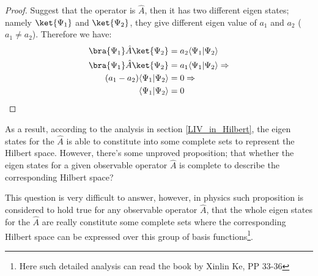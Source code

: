 \begin{proof}
  Suggest that the operator is $\hat{A}$, then it has two different
  eigen states; namely $\ket{\Psi_{1}}$ and $\ket{\Psi_{2}}$, they
  give different eigen value of $a_{1}$ and $a_{2}$ ($a_{1} \neq
  a_{2}$).  Therefore we have:
\begin{align}\label{}
\bra{\Psi_{1}}\hat{A}\ket{\Psi_{2}} &=
a_{2}\langle\Psi_{1}|\Psi_{2}\rangle \nonumber \\
\bra{\Psi_{1}}\hat{A}\ket{\Psi_{2}} &=
a_{1}\langle\Psi_{1}|\Psi_{2}\rangle \Rightarrow \nonumber \\
(a_{1}-a_{2})\langle\Psi_{1}|\Psi_{2}\rangle &= 0 \Rightarrow \nonumber \\
\langle\Psi_{1}|\Psi_{2}\rangle &= 0
\end{align}
\qedhere
\end{proof}
As a result, according to the analysis in section
\ref{LIV_in_Hilbert}, the eigen states for the $\hat{A}$ is able to
constitute into some complete sets to represent the Hilbert space.
However, there's some unproved proposition; that whether the eigen
states for a given observable operator $\hat{A}$ is complete to
describe the corresponding Hilbert space?

This question is very difficult to answer, however, in physics such
proposition is considered to hold true for any observable operator
$\hat{A}$, that the whole eigen states for the $\hat{A}$ are really
constitute some complete sets where the corresponding Hilbert space
can be expressed over this group of basis functions\footnote{Here
such detailed analysis can read the book by Xinlin
Ke\cite{XingLinKe}, PP 33-36}.


